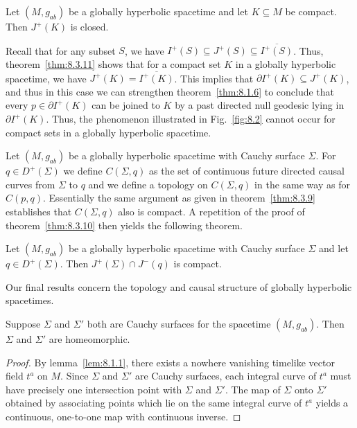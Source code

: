\begin{theorem}\label{thm:8.3.11}
Let \((M,g_{ab})\) be a globally hyperbolic spacetime and let \(K\subseteq M\) be
compact. Then \(J^+(K)\) is closed.
\end{theorem}

Recall that for any subset \(S\), we have
\(I^+(S)\subseteq J^+(S)\subseteq\overline{I^+(S)}\). Thus,
theorem~\ref{thm:8.3.11} shows that for a compact set \(K\) in a globally
hyperbolic spacetime, we have \(J^+(K)=\overline{I^+(K)}\). This implies that
\(\partial I^+(K)\subseteq J^+(K)\), and thus in this case we can strengthen
theorem~\ref{thm:8.1.6} to conclude that every \(p\in\partial I^+(K)\) can be
joined to \(K\) by a past directed null geodesic lying in \(\partial I^+(K)\). Thus,
the phenomenon illustrated in Fig.~\ref{fig:8.2} cannot occur for compact sets in a
globally hyperbolic spacetime.

Let \((M,g_{ab})\) be a globally hyperbolic spacetime with Cauchy surface
\(\Sigma\). For \(q\in D^+(\Sigma)\) we define \(C(\Sigma,q)\) as the set of
continuous future directed causal curves from \(\Sigma\) to \(q\) and we define a
topology on \(C(\Sigma,q)\) in the same way as for \(C(p,q)\). Essentially the same
argument as given in theorem~\ref{thm:8.3.9} establishes that \(C(\Sigma,q)\) also
is compact. A repetition of the proof of theorem~\ref{thm:8.3.10} then yields the
following theorem.

\begin{theorem}\label{thm:8.3.12}
Let \((M,g_{ab})\) be a globally hyperbolic spacetime with Cauchy surface
\(\Sigma\) and let \(q\in D^+(\Sigma)\). Then \(J^+(\Sigma)\cap J^-(q)\) is compact.
\end{theorem}

Our final results concern the topology and causal structure of globally hyperbolic
spacetimes.

\begin{proposition}\label{prop:8.3.13}
Suppose \(\Sigma\) and \(\Sigma'\) both are Cauchy surfaces for the spacetime
\((M,g_{ab})\). Then \(\Sigma\) and \(\Sigma'\) are homeomorphic.
\end{proposition}
\begin{proof}
By lemma~\ref{lem:8.1.1}, there exists a nowhere vanishing timelike vector field
\(t^a\) on \(M\). Since \(\Sigma\) and \(\Sigma'\) are Cauchy surfaces, each
integral curve of \(t^a\) must have precisely one intersection point with \(\Sigma\)
and \(\Sigma'\). The map of \(\Sigma\) onto \(\Sigma'\) obtained by associating
points which lie on the same integral curve of \(t^a\) yields a continuous,
one-to-one map with continuous inverse.
\end{proof}

